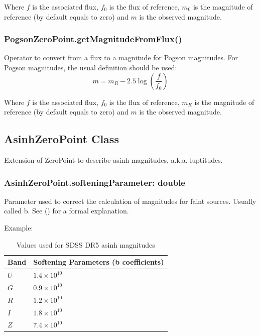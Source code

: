 \documentclass[11pt,a4paper]{ivoa}
\begin{document}
Where $f$ is the associated flux, $f_0$ is the flux of reference, $m_0$ is 
the magnitude of reference (by default equals to zero) and $m$ is the 
observed magnitude.
\par

\subsubsection{PogsonZeroPoint.getMagnitudeFromFlux()}
Operator to convert from a flux to a magnitude for Pogson magnitudes. 
For Pogson magnitudes, the usual definition should be used:
\begin{equation} \label{eq:26}
m = m_R - 2.5\log(\frac{f}{f_0 })
\end{equation}

Where $f$ is the associated flux, $f_0$ is the flux of reference, 
$m_R$ is the magnitude of reference (by default equals to zero) and 
$m$ is the observed magnitude.
\par

\subsection{AsinhZeroPoint Class}
Extension of ZeroPoint  to describe asinh magnitudes, a.k.a. luptitudes.
\par

\subsubsection{AsinhZeroPoint.softeningParameter: double}
Parameter used to correct the calculation of magnitudes for faint 
sources. Usually called b. See (\citep{1999AJ....118.1406L}) for 
a formal explanation.
\par

Example:
\par


\begin{table}[ht]
\centering
    \begin{tabular}{m{2.7cm}m{8cm}}
	\hline %
Band & Softening Parameters (b coefficients) \\
\hline
 $U$ & $1.4 \times 10^{10}$ \\
 $G$ & $0.9 \times 10^{10}$ \\
 $R$ & $1.2 \times 10^{10}$ \\
 $I$ & $1.8 \times 10^{10}$ \\
 $Z$ & $7.4 \times 10^{10}$ \\
\hline
\end{tabular}
\caption{Values used for SDSS DR5 asinh magnitudes}

\end{table}
\end{document}
